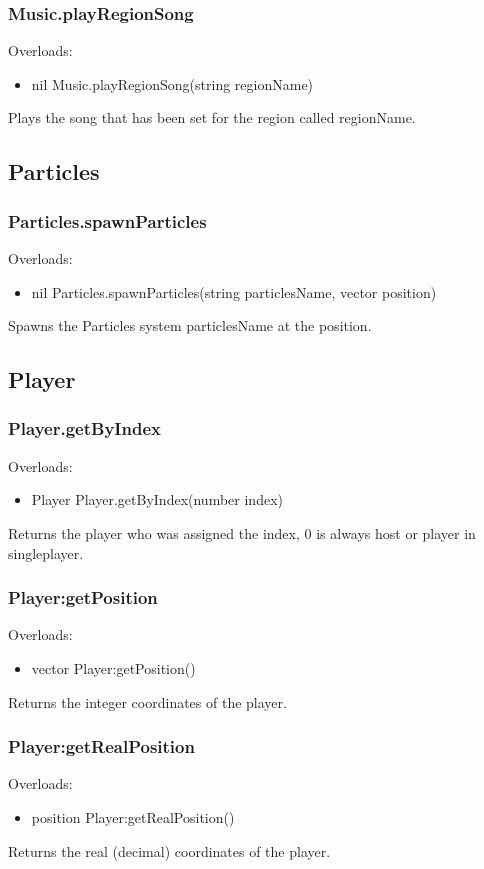 \documentclass{book}
\newenvironment{ulist}
	{\begin{itemize}
			\itemsep0em}
	{\end{itemize}}
\begin{document}
\subsubsection{Music.playRegionSong}
Overloads:
\begin{ulist}
	\item nil Music.playRegionSong(string regionName)
\end{ulist}
Plays the song that has been set for the region called regionName.


\subsection{Particles}
\subsubsection{Particles.spawnParticles}
Overloads:
\begin{ulist}
	\item nil Particles.spawnParticles(string particlesName, vector position)
\end{ulist}
Spawns the Particles system particlesName at the position.

\subsection{Player}
\subsubsection{Player.getByIndex}
Overloads:
\begin{ulist}
	\item Player Player.getByIndex(number index)
\end{ulist}
Returns the player who was assigned the index, 0 is always host or player in singleplayer.

\subsubsection{Player:getPosition}
Overloads:
\begin{ulist}
	\item vector Player:getPosition()
\end{ulist}
Returns the integer coordinates of the player.

\subsubsection{Player:getRealPosition}
Overloads:
\begin{ulist}
	\item position Player:getRealPosition()
\end{ulist}
Returns the real (decimal) coordinates of the player.
\end{document}
